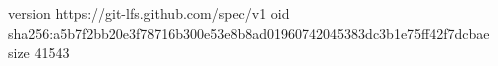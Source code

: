 version https://git-lfs.github.com/spec/v1
oid sha256:a5b7f2bb20e3f78716b300e53e8b8ad01960742045383dc3b1e75ff42f7dcbae
size 41543
